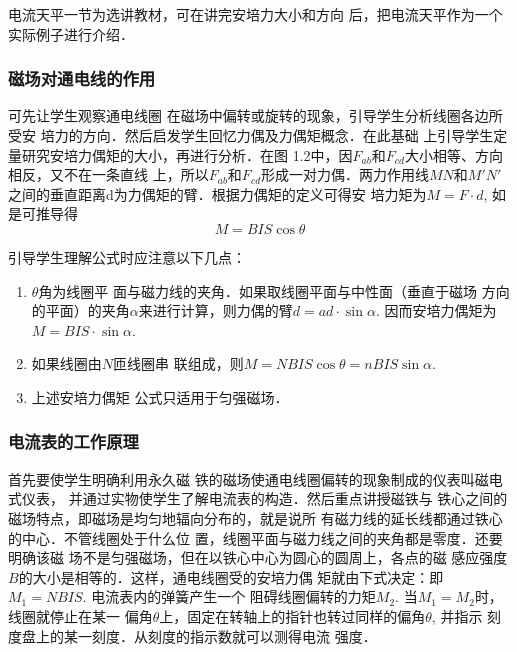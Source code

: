 电流天平一节为选讲教材，可在讲完安培力大小和方向
后，把电流天平作为一个实际例子进行介绍．


\subsubsection{磁场对通电线的作用}

可先让学生观察通电线圈
在磁场中偏转或旋转的现象，引导学生分析线圈各边所受安
培力的方向．然后启发学生回忆力偶及力偶矩概念．在此基础
上引导学生定量研究安培力偶矩的大小，再进行分析．在图
1.2中，因$F_{ab}$和$F_{cd}$大小相等、方向相反，又不在一条直线
上，所以$F_{ab}$和$F_{cd}$形成一对力偶．两力作用线$MN$和$M'N'$
之间的垂直距离d为力偶矩的臂．根据力偶矩的定义可得安
培力矩为$M=F\cdot d$, 如是可推导得
\[M=BIS\cos\theta\]

引导学生理解公式时应注意以下几点：
\begin{enumerate}
\item $\theta$角为线圈平
面与磁力线的夹角．如果取线圈平面与中性面（垂直于磁场
方向的平面）的夹角$\alpha$来进行计算，则力偶的臂$d=ad\cdot \sin\alpha$.
因而安培力偶矩为$M=BIS\cdot \sin\alpha$.
\item 如果线圈由$N$匝线圈串
联组成，则$M=NBIS\cos\theta=nBIS\sin\alpha$.
\item 上述安培力偶矩
公式只适用于匀强磁场．
\end{enumerate}

\subsubsection{电流表的工作原理}

首先要使学生明确利用永久磁
铁的磁场使通电线圈偏转的现象制成的仪表叫磁电式仪表，
并通过实物使学生了解电流表的构造．然后重点讲授磁铁与
铁心之间的磁场特点，即磁场是均匀地辐向分布的，就是说所
有磁力线的延长线都通过铁心的中心．不管线圈处于什么位
置，线圈平面与磁力线之间的夹角都是零度．还要明确该磁
场不是匀强磁场，但在以铁心中心为圆心的圆周上，各点的磁
感应强度$B$的大小是相等的．这样，通电线圈受的安培力偶
矩就由下式决定：即$M_1=NBIS$. 电流表内的弹簧产生一个
阻碍线圈偏转的力矩$M_2$. 当$M_1=M_2$时，线圈就停止在某一
偏角$\theta$上，固定在转轴上的指针也转过同样的偏角$\theta$, 并指示
刻度盘上的某一刻度．从刻度的指示数就可以测得电流
强度．


